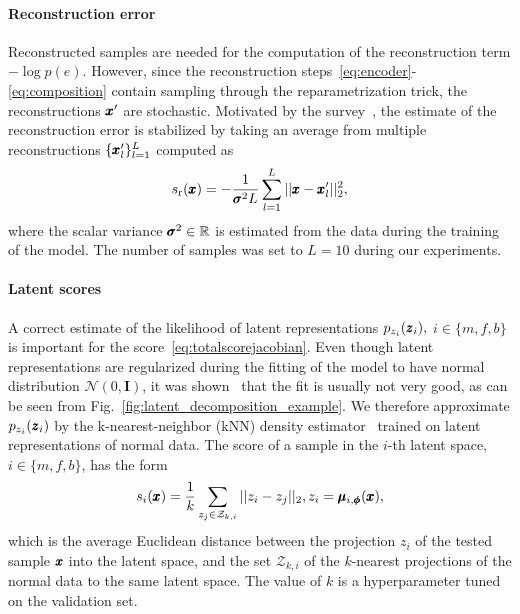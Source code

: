 \paragraph{Reconstruction error}
Reconstructed samples are needed for the computation of the reconstruction term $-\log p(e)$. However, since the reconstruction steps~\eqref{eq:encoder}-\eqref{eq:composition} contain sampling through the reparametrization trick, the reconstructions $\pmb{{x}}'$ are stochastic. Motivated by the survey~\cite{vskvara2021comparison}, the estimate of the reconstruction error is stabilized by taking an average from multiple reconstructions $\lbrace \pmb{{x}}'_l \rbrace_{l=1}^L$ computed as
\begin{equation} \label{eq:rsscore}
    s_{\text{r}}(\pmb{{x}}) = - \frac{1}{\pmb{{\sigma}}^2 L}\sum_{l=1}^L \vert \vert \pmb{{x}}-\pmb{{x}}'_l\vert \vert_2^2,
\end{equation}
where the scalar variance $\pmb{{\sigma}}^2 \in \mathbb{R}$ is estimated from the data during the training of the model. The number of samples was set to $L=10$ during our experiments. 

\paragraph{Latent scores} A correct estimate of the likelihood of latent representations $p_{z_{i}}(\pmb{{z}}_i),$ $i \in \{m, f, b\}$ is important for the score~\eqref{eq:totalscorejacobian}. Even though latent representations are regularized during the fitting of the model to have normal distribution $\mathcal{N}(0,\textbf{I})$, it was shown~\cite{dai2019diagnosing} that the fit is usually not very good, as can be seen from Fig.~\ref{fig:latent_decomposition_example}. We therefore approximate $p_{z_{i}}(\pmb{{z}}_i)$ by the k-nearest-neighbor (kNN) density estimator~\cite{devroye1977strong} trained on latent representations of normal data. The score of a sample in the $i$-th latent space, $i \in \lbrace m, f, b \rbrace$, has the form
\begin{equation} \label{eq:knnscore}
    s_{i}(\pmb{{x}}) = \frac{1}{k} \sum_{z_j \in \mathcal{Z}_{k,i}} \vert \vert z_i - z_j \vert \vert_2, z_i = \pmb{{\mu}}_{i,\pmb{{\phi}}}(\pmb{{x}}), 
\end{equation}
which is the average Euclidean distance between the projection $z_i$ of the tested sample $\pmb{{x}}$ into the latent space, and the set $\mathcal{Z}_{k,i}$ of the $k$-nearest projections of the normal data to the same latent space. The value of $k$ is a hyperparameter tuned on the validation set.


